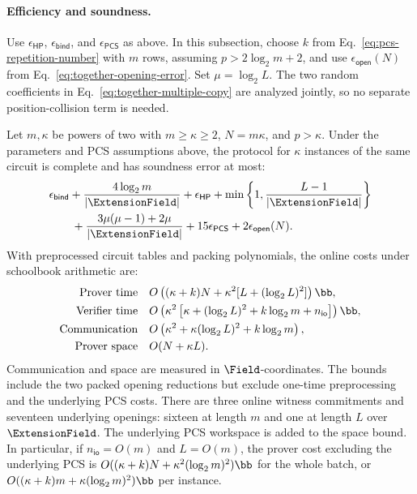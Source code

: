 \paragraph{Efficiency and soundness.}
Use \(\epsilon_{\mathsf{HP}}\), \(\epsilon_{\mathsf{bind}}\),
and \(\epsilon_{\mathsf{PCS}}\) as above.
In this subsection, choose \(k\) from
Eq.~\eqref{eq:pcs-repetition-number} with \(m\) rows,
assuming \(p>2\log_2m+2\), and use
\(\epsilon_{\mathsf{open}}(N)\) from
Eq.~\eqref{eq:together-opening-error}.
Set \(\mu=\log_2L\).
The two random coefficients in Eq.~\eqref{eq:together-multiple-copy}
are analyzed jointly, so no separate position-collision term is needed.

\begin{theorem}
\label{theorem:multiple-instance-packing}
Let \(m,\kappa\) be powers of two with \(m\geq\kappa\geq2\),
\(N=m\kappa\), and \(p>\kappa\).
Under the parameters and PCS assumptions above, the protocol
for \(\kappa\) instances of the same circuit is complete and has
soundness error at most:
\begin{equation}
\begin{aligned}
    &\epsilon_{\mathsf{bind}}
       +\frac{4\log_2m}{|\ExtensionField|}
       +\epsilon_{\mathsf{HP}}
       +\min\left\{1,\frac{L-1}{|\ExtensionField|}\right\}\\
    &\qquad{}
       +\frac{3\mu(\mu-1)+2\mu}{|\ExtensionField|}
       +15\epsilon_{\mathsf{PCS}}
       +2\epsilon_{\mathsf{open}}(N).
\end{aligned}
\label{eq:together-multiple-soundness}
\end{equation}
With preprocessed circuit tables and packing polynomials, the
online costs under schoolbook arithmetic are:
\begin{equation}
\begin{aligned}
    \text{Prover time}\quad
       &O\left((\kappa+k)N+
          \kappa^2[L+(\log_2L)^2]\right)\bb,\\
    \text{Verifier time}\quad
       &O\left(\kappa^2\left[
          \kappa+(\log_2L)^2+k\log_2m+n_{\mathsf{io}}
          \right]\right)\bb,\\
    \text{Communication}\quad
       &O\left(\kappa^2+\kappa(\log_2L)^2
          +k\log_2m\right),\\
    \text{Prover space}\quad
       &O(N+\kappa L).
\end{aligned}
\label{eq:together-multiple-efficiency}
\end{equation}
Communication and space are measured in \(\Field\)-coordinates.
The bounds include the two packed opening reductions but exclude
one-time preprocessing and the underlying PCS costs.
There are three online witness commitments and seventeen
underlying openings: sixteen at length \(m\) and one at length
\(L\) over \(\ExtensionField\).
The underlying PCS workspace is added to the space bound.
In particular, if \(n_{\mathsf{io}}=O(m)\) and \(L=O(m)\),
the prover cost excluding the underlying PCS is
\(O((\kappa+k)N+\kappa^2(\log_2m)^2)\bb\) for the whole batch,
or \(O((\kappa+k)m+\kappa(\log_2m)^2)\bb\) per instance.
\end{theorem}

